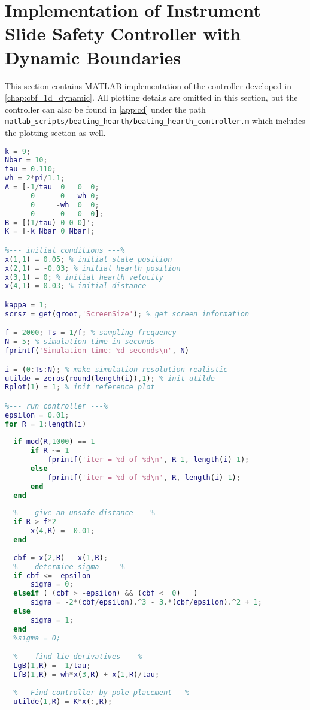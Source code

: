 \section{Implementation of Instrument Slide Safety Controller with Dynamic Boundaries}\label{sec:app:dynamic}
This section contains MATLAB implementation of the controller developed in \autoref{chap:cbf_1d_dynamic}. All plotting details are omitted in this section, but the controller can also be found in \autoref{app:cd} under the path \texttt{matlab\_scripts/beating\_hearth/beating\_hearth\_controller.m} which includes the plotting section as well.\\

\begin{lstlisting}[language=matlab]
%--- setup systems ---%
k = 9;
Nbar = 10;
tau = 0.110;
wh = 2*pi/1.1;
A = [-1/tau  0   0  0;
      0      0   wh 0;
      0     -wh  0  0;
      0      0   0  0];
B = [(1/tau) 0 0 0]';
K = [-k Nbar 0 Nbar];

%--- initial conditions ---%
x(1,1) = 0.05; % initial state position
x(2,1) = -0.03; % initial hearth position
x(3,1) = 0; % initial hearth velocity
x(4,1) = 0.03; % initial distance

kappa = 1;
scrsz = get(groot,'ScreenSize'); % get screen information

f = 2000; Ts = 1/f; % sampling frequency
N = 5; % simulation time in seconds
fprintf('Simulation time: %d seconds\n', N)

i = (0:Ts:N); % make simulation resolution realistic
utilde = zeros(round(length(i)),1); % init utilde
Rplot(1) = 1; % init reference plot

%--- run controller ---%
epsilon = 0.01; 
for R = 1:length(i)
    
  if mod(R,1000) == 1 
      if R ~= 1
          fprintf('iter = %d of %d\n', R-1, length(i)-1);
      else
          fprintf('iter = %d of %d\n', R, length(i)-1);
      end
  end
  
  %--- give an unsafe distance ---%
  if R > f*2 
      x(4,R) = -0.01;
  end
  
  cbf = x(2,R) - x(1,R);
  %--- determine sigma  ---% 
  if cbf <= -epsilon
      sigma = 0;
  elseif ( (cbf > -epsilon) && (cbf <  0)   )
      sigma = -2*(cbf/epsilon).^3 - 3.*(cbf/epsilon).^2 + 1;
  else
      sigma = 1;
  end
  %sigma = 0;

  %--- find lie derivatives ---%
  LgB(1,R) = -1/tau;
  LfB(1,R) = wh*x(3,R) + x(1,R)/tau;
  
  %-- Find controller by pole placement --%
  utilde(1,R) = K*x(:,R);


\end{lstlisting}
